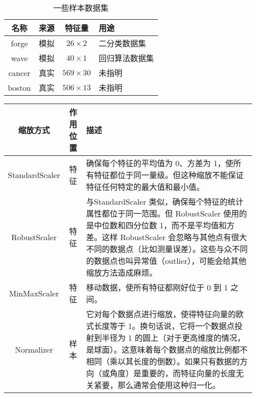 \begin{table}
    \centering
    \caption{一些样本数据集}
    \begin{tabular}{cccl}
        \hline
        名称     & 来源 & 特征量            & 用途      \\
        \hline
        forge  & 模拟 & $26\times 2$   & 二分类数据集  \\
        wave   & 模拟 & $40\times 1$   & 回归算法数据集 \\
        cancer & 真实 & $569\times 30$ & 未指明     \\
        boston & 真实 & $506\times 13$ & 未指明     \\
        \hline
    \end{tabular}
\end{table}

\begin{table}
    \centering
    \begin{tabularx}{\textwidth}{ccX}
        \hline
        缩放方式           & 作用位置 & 描述                                                                                                                                                              \\
        \hline
        StandardScaler & 特征   & 确保每个特征的平均值为 0、方差为 1，使所有特征都位于同一量级。但这种缩放不能保证特征任何特定的最大值和最小值。                                                                                                       \\
        RobustScaler   & 特征   & 与StandardScaler 类似，确保每个特征的统计属性都位于同一范围。但 RobustScaler 使用的是中位数和四分位数 1，而不是平均值和方差。这样 RobustScaler 会忽略与其他点有很大不同的数据点（比如测量误差）。这些与众不同的数据点也叫异常值（outlier），可能会给其他缩放方法造成麻烦。 \\
        MinMaxScaler   & 特征   & 移动数据，使所有特征都刚好位于 0 到 1 之间。                                                                                                                                       \\
        Normalizer     & 样本   & 它对每个数据点进行缩放，使得特征向量的欧式长度等于 1。换句话说，它将一个数据点投射到半径为 1 的圆上（对于更高维度的情况，是球面）。这意味着每个数据点的缩放比例都不相同（乘以其长度的倒数）。如果只有数据的方向（或角度）是重要的，而特征向量的长度无关紧要，那么通常会使用这种归一化。                  \\
        \hline
    \end{tabularx}
\end{table}

